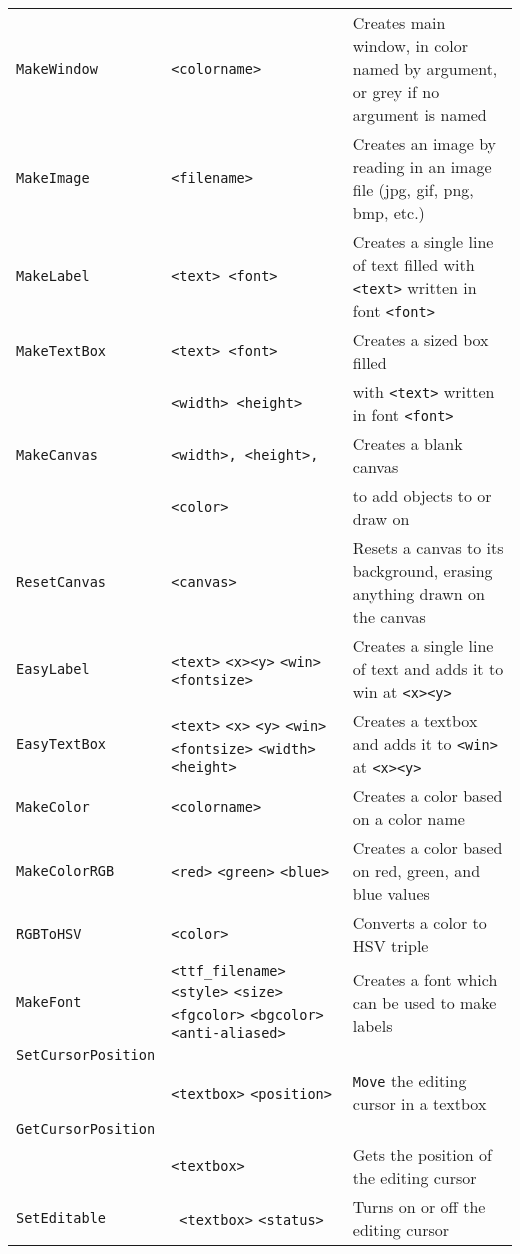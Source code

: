 \begin{longtable}{p{3cm}p{3cm}p{6cm}}
\verb+MakeWindow+ &\verb+<colorname>+ &Creates main window, in color named by argument, or grey if no argument is named\\ 
\verb+MakeImage+ &\verb+<filename>+ &Creates an image by reading in an image file (jpg, gif, png, bmp, etc.)\\ 
\verb+MakeLabel+ &\verb+<text> <font>+&Creates a single line of text filled with \verb+<text>+ written in font \verb+<font>+\\ 
\verb+MakeTextBox+ &\verb+<text> <font>+ &Creates a sized box filled \\ 
&\verb+<width> <height>+& with \verb+<text>+ written in font \verb+<font>+ \\ 
\verb+MakeCanvas+& \texttt{<width>, <height>,} &Creates a blank canvas\\
                  &  \texttt{<color>} &to add objects to or draw on\\
\verb+ResetCanvas+&\verb+<canvas>+&Resets a canvas to its background,
erasing anything drawn on the canvas\\
\verb+EasyLabel+ &\verb+<text>+ \verb+<x>+\verb+<y>+ \verb+<win>+\verb+<fontsize>+&Creates a single line of text and adds it to win at \verb+<x>+\verb+<y>+\\ 
\verb+EasyTextBox+ &\verb+<text>+ \verb+<x>+ \verb+<y>+ \verb+<win>+ \verb+<fontsize>+ \verb+<width>+ \verb+<height>+&Creates a textbox and adds it to \verb+<win>+ at \verb+<x>+\verb+<y>+\\ 
\verb+MakeColor+ &\verb+<colorname>+ & Creates a color based on a color name\\ 
\verb+MakeColorRGB+ &\verb+<red>+ \verb+<green>+ \verb+<blue>+ & Creates a color based on red, green, and blue values\\ 
\verb+RGBToHSV+ &\verb+<color>+ & Converts a color to HSV triple\\ 
\verb+MakeFont+ &\verb+<ttf_filename>+ \verb+<style>+ \verb+<size>+ \verb+<fgcolor>+ \verb+<bgcolor>+ \verb+<anti-aliased>+&Creates a font which can be used to make labels \\ 
\verb+SetCursorPosition+\\
   &\verb+<textbox>+ \verb+<position>+ & \verb+Move+ the editing cursor in a textbox\\ 
\verb+GetCursorPosition+\\
   &\verb+<textbox>+ &Gets the position of the editing cursor\\ 
\verb+SetEditable+ &\verb+ <textbox>+ \verb+<status>+& Turns on or off the editing cursor\\ 

\end{longtable}
